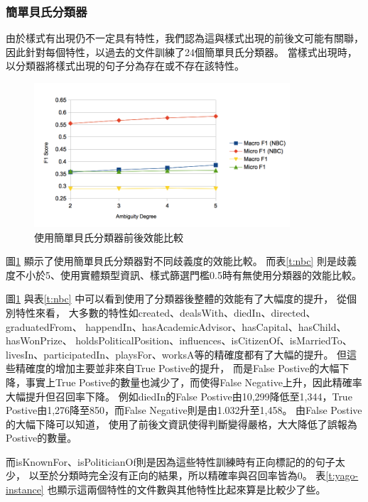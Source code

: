 \subsubsection{簡單貝氏分類器}
由於樣式有出現仍不一定具有特性，我們認為這與樣式出現的前後文可能有關聯，
因此針對每個特性，以過去的文件訓練了24個簡單貝氏分類器。
當樣式出現時，以分類器將樣式出現的句子分為存在或不存在該特性。

\begin{figure}[h]
    \centering
    \includegraphics[width=0.85\textwidth]{images/04-nbc}
    \caption{使用簡單貝氏分類器前後效能比較}
    \label{i:nbc}
\end{figure}



圖\ref{i:nbc} 顯示了使用簡單貝氏分類器對不同歧義度的效能比較。
而表\ref{t:nbc} 則是歧義度不小於5、使用實體類型資訊、樣式篩選門檻0.5時有無使用分類器的效能比較。

圖\ref{i:nbc} 與表\ref{t:nbc} 中可以看到使用了分類器後整體的效能有了大幅度的提升，
從個別特性來看，
大多數的特性如created、dealsWith、diedIn、directed、graduatedFrom、
happendIn、hasAcademicAdvisor、hasCapital、hasChild、hasWonPrize、
holdsPoliticalPosition、influences、isCitizenOf、isMarriedTo、
livesIn、participatedIn、playsFor、worksA等的精確度都有了大幅的提升。
但這些精確度的增加主要並非來自True Postive的提升，
而是False Postive的大幅下降，事實上True Postive的數量也減少了，而使得False Negative上升，因此精確率大幅提升但召回率下降。
例如diedIn的False Postive由10,299降低至1,344，True Postive由1,276降至850，而False Negative則是由1.032升至1,458。
由False Postive的大幅下降可以知道，
使用了前後文資訊使得判斷變得嚴格，大大降低了誤報為Postive的數量。

而isKnownFor、isPoliticianOf則是因為這些特性訓練時有正向標記的的句子太少，
以至於分類時完全沒有正向的結果，所以精確率與召回率皆為0。
表\ref{t:yago-instance} 也顯示這兩個特性的文件數與其他特性比起來算是比較少了些。


